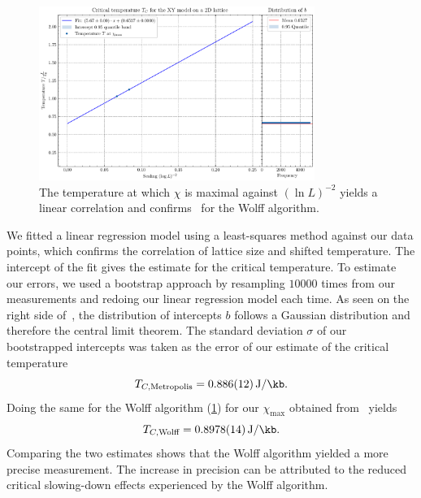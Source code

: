 		\begin{figure}[htbp]
			\centering
			\includegraphics[width=0.8\textwidth]{../figures/Wolff/Critical_Temperature.pdf}
						\caption[Estimating $T_C$ using the Wolff algorithm by plotting $T$ where $\chi$ is maximal against $(\ln L)^{-2}$]{The temperature at which $\chi$ is maximal against $(\ln L)^{-2}$ yields a linear correlation and confirms~ for the Wolff algorithm.}
			\label{fig:critical_temperature_wolf}
		\end{figure}
		
		We fitted a linear regression model using a least-squares method against our data points, which confirms the correlation of lattice size and shifted temperature. The intercept of the fit gives the estimate for the critical temperature. To estimate our errors, we used a bootstrap approach by resampling $\num{10 000}$ times from our measurements and redoing our linear regression model each time. As seen on the right side of~, the distribution of intercepts $b$ follows a Gaussian distribution and therefore the central limit theorem. The standard deviation $\sigma$ of our bootstrapped intercepts was taken as the error of our estimate of the critical temperature
		\begin{equation}
			T_{C, \text{Metropolis}} = \SI{0.886(12)}{\J\per\kb}.
		\end{equation}
		Doing the same for the Wolff algorithm (\cref{fig:critical_temperature_wolf}) for our $\chi_\text{max}$ obtained from~ yields
		\begin{equation}
			T_{C, \text{Wolff}} = \SI{0.8978(14)}{\J\per\kb}.
		\end{equation}
		Comparing the two estimates shows that the Wolff algorithm yielded a more precise measurement. The increase in precision can be attributed to the reduced critical slowing-down effects experienced by the Wolff algorithm.
		
